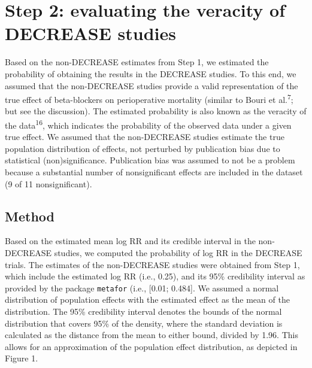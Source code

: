 \documentclass[]{article}
\begin{document}
\section{Step 2: evaluating the veracity of DECREASE
studies}\label{step-2-evaluating-the-veracity-of-decrease-studies}

Based on the non-DECREASE estimates from Step 1, we estimated the
probability of obtaining the results in the DECREASE studies. To this
end, we assumed that the non-DECREASE studies provide a valid
representation of the true effect of beta-blockers on perioperative
mortality (similar to Bouri et al.\textsuperscript{7}; but see the
discussion). The estimated probability is also known as the veracity of
the data\textsuperscript{16}, which indicates the probability of the
observed data under a given true effect. We assumed that the
non-DECREASE studies estimate the true population distribution of
effects, not perturbed by publication bias due to statistical
(non)significance. Publication bias was assumed to not be a problem
because a substantial number of nonsignificant effects are included in
the dataset (9 of 11 nonsignificant).

\subsection{Method}\label{method}

Based on the estimated mean log RR and its credible interval in the
non-DECREASE studies, we computed the probability of log RR in the
DECREASE trials. The estimates of the non-DECREASE studies were obtained
from Step 1, which include the estimated log RR (i.e., 0.25), and its
95\% credibility interval as provided by the package \texttt{metafor}
(i.e., {[}0.01; 0.484{]}. We assumed a normal distribution of population
effects with the estimated effect as the mean of the distribution. The
95\% credibility interval denotes the bounds of the normal distribution
that covers 95\% of the density, where the standard deviation is
calculated as the distance from the mean to either bound, divided by
1.96. This allows for an approximation of the population effect
distribution, as depicted in Figure 1.
\end{document}
